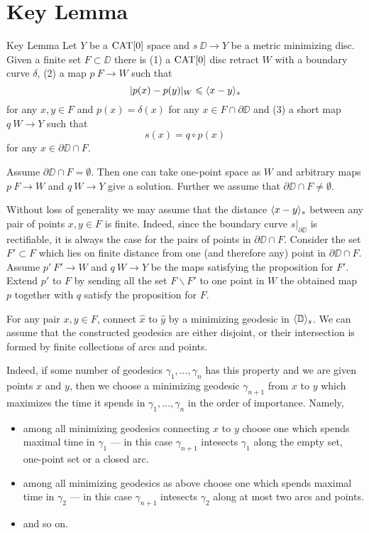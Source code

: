 \section{Key Lemma}\label{Key Lemma}


\begin{thm}{Key Lemma}\label{lem:key}
Let $Y$ be a $\mathop{\rm CAT}\nolimits[0]$ space and $s\:\DD\to Y$ 
be a metric minimizing disc.
Given a finite set $F\subset \DD$
there is 
(1) a $\mathop{\rm CAT}\nolimits[0]$ disc retract $W$ with a boundary curve $\delta$,
(2) a map $p\:F\to W$ such that
\[|p(x)-p(y)|_W\leqslant \langle x-y\rangle_s\] 
for any $x,y\in F$ and $p(x)=\delta(x)$ for any $x\in F\cap \partial\DD$
and (3) a short map $q\:W\to Y$ such that
\[s(x)=q\circ p(x)\] 
for any $x\in\partial\DD\cap F$.
\end{thm} 

 Assume $\partial \DD\cap F= \emptyset$.
Then one can take one-point space as $W$ and arbitrary maps $p\:F\to W$ and $q\:W\to Y$ give a solution.
Further we assume that $\partial \DD\cap F\ne\emptyset$.

Without loss of generality we may assume that the distance $\langle x-y\rangle_s$
between any pair of points $x,y\in F$ is finite.
Indeed, since the boundary curve $s|_{\partial\DD}$ is rectifiable,
it is always the case for the pairs of points in $\partial \DD\cap F$.
Consider the set $F'\subset F$ which lies on finite distance from one (and therefore any) point in $\partial \DD\cap F$.
Assume $p'\:F'\to W$ and $q\:W\to Y$ be the maps satisfying the proposition for $F'$.
Extend $p'$ to $F$ by sending all the set $F\backslash F'$ to one point in $W$ the obtained map $p$ together with $q$ satisfy the proposition for $F$.

For any pair $x,y\in F$, connect $\hat x$ to $\hat y$ by a minimizing geodesic in $\langle\mathbb{D}\rangle_s$. 
We can assume that the constructed geodesics 
are either disjoint, or their intersection is formed by finite collections of arcs and points.

Indeed, if some number of geodesics $\gamma_1,\dots,\gamma_n$ has this property and we are given points $x$ and $y$, then
we choose a minimizing geodesic $\gamma_{n+1}$ from $x$ to $y$ which maximizes the time it spends in $\gamma_1,\dots,\gamma_n$  in the order of importance.
Namely, 
\begin{itemize}
\item  among all minimizing geodesics connecting $x$ to $y$
choose one which spends maximal time in $\gamma_1$ --- in this case $\gamma_{n+1}$ intesects $\gamma_1$ along the empty set, one-point set or a closed arc.
\item among all minimizing geodesics as above
choose one which spends maximal time in $\gamma_2$ --- in this case $\gamma_{n+1}$ intesects $\gamma_2$ along at most two arcs and points.
\item and so on.
\end{itemize}

